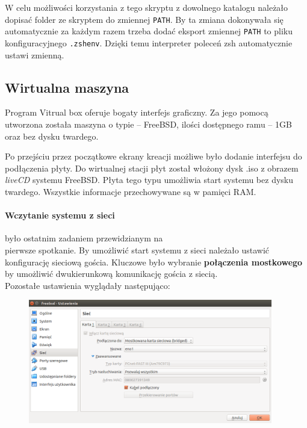 \documentclass{article}
\begin{document}
W celu możliwości korzystania z tego skryptu z dowolnego katalogu należało dopisać folder ze skryptem do zmiennej \texttt{PATH}. By ta zmiana dokonywała się automatycznie za każdym razem trzeba dodać eksport zmiennej \texttt{PATH} to pliku konfiguracyjnego \texttt{.zshenv}. Dzięki temu interpreter poleceń zsh automatycznie ustawi zmienną.

\subsection{Wirtualna maszyna}
Program Vitrual box oferuje bogaty interfejs graficzny. Za jego pomocą utworzona została maszyna o typie -- FreeBSD, ilości dostępnego ramu -- 1GB oraz bez dysku twardego.

Po przejściu przez początkowe ekrany kreacji możliwe było dodanie interfejsu do podłączenia płyty. Do wirtualnej stacji płyt został włożony dysk .iso z obrazem \textit{liveCD} systemu FreeBSD. Płyta tego typu umożliwia start systemu bez dysku twardego. Wszystkie informacje przechowywane są w pamięci RAM.

\paragraph{Wczytanie systemu z sieci} było ostatnim zadaniem przewidzianym na \\ pierwsze spotkanie. By umożliwić start systemu z sieci należało ustawić konfigurację sieciową gościa. Kluczowe było wybranie \textbf{połączenia mostkowego} by umożliwić dwukierunkową komunikację gościa z siecią. \\ Pozostałe ustawienia wyglądały następująco:
\begin{figure}[h]
    \centering
    \includegraphics[width=0.95\textwidth]{ustawienia_karty_sieciowej}
\end{figure}
\end{document}
